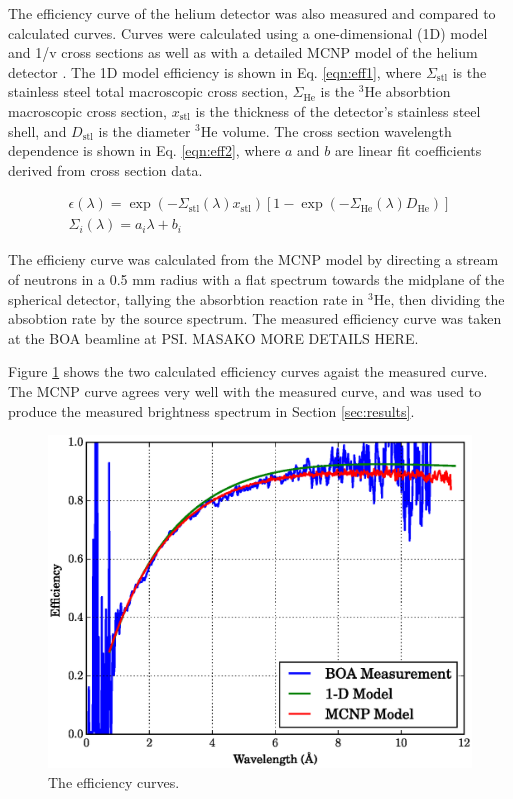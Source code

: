 \documentclass[5p,12pt]{elsarticle}
\begin{document}
The efficiency curve of the helium detector was also measured and compared to calculated curves.  Curves were calculated using a one-dimensional (1D) model and 1/v cross sections as well as with a detailed MCNP model of the helium detector \cite{bonner_manual}.  The 1D model efficiency is shown in Eq. \ref{eqn:eff1}, where $\Sigma_{\textrm{stl}}$ is the stainless steel total macroscopic cross section, $\Sigma_{\textrm{He}}$ is the $^3$He absorbtion macroscopic cross section, $x_{\textrm{stl}}$ is the thickness of the detector's stainless steel shell, and  $D_{\textrm{stl}}$ is the diameter $^3$He volume.  The cross section wavelength dependence is shown in Eq. \ref{eqn:eff2}, where $a$ and $b$ are linear fit coefficients derived from cross section data.  

\begin{gather}
     \label{eqn:eff1} \epsilon(\lambda) = \exp \left(-\Sigma_{\textrm{stl}}(\lambda) x_{\textrm{stl}}\right)[1-\exp(-\Sigma_{\textrm{He}}(\lambda) D_{\textrm{He}})] \\
     \label{eqn:eff2} \Sigma_i(\lambda) = a_i\lambda+b_i
\end{gather}

The efficieny curve was calculated from the MCNP model by directing a stream of neutrons in a 0.5 mm radius with a flat spectrum towards the midplane of the spherical detector, tallying the absorbtion reaction rate in $^{3}$He, then dividing the absobtion rate by the source spectrum.  The measured efficiency curve was taken at the BOA beamline at PSI.  MASAKO MORE DETAILS HERE.

Figure \ref{fig:eff} shows the two calculated efficiency curves agaist the measured curve.  The MCNP curve agrees very well with the measured curve, and was used to produce the measured brightness spectrum in Section \ref{sec:results}.

\begin{figure}[h!] 
  \centering
    \includegraphics[width=\columnwidth]{graphics/eff.eps}
     \caption{The efficiency curves. \label{fig:eff} }
\end{figure}
\end{document}
